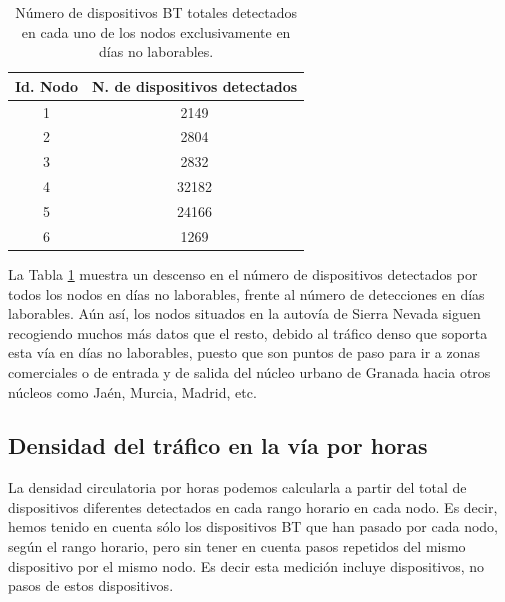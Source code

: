 \documentclass[twocolumn,twoside]{Jornadas}
\begin{document}
 \begin{table}
 \caption{Número de dispositivos BT totales detectados en cada uno de los nodos exclusivamente en días no laborables.
 \label{VehiculosFestivos}}
 \begin{center}
 \begin{tabular}{|c|c|}
 \hline
Id. Nodo  &  N. de dispositivos detectados  \\
 \hline
    1     &    2149  \\
 \hline
    2     &    2804  \\
 \hline
    3     &    2832  \\
 \hline
    4     &    32182  \\
 \hline
    5     &    24166  \\
 \hline
    6     &    1269  \\
 \hline
 \end{tabular}
 \end{center}
 \end{table}

La Tabla \ref{VehiculosFestivos} muestra un descenso en el número de dispositivos detectados por todos los nodos en días no laborables, frente al número de 
detecciones en días laborables. Aún así, los nodos situados en la autovía de Sierra Nevada siguen recogiendo muchos más datos que el resto, debido al 
tráfico denso que soporta esta vía en días no laborables, puesto que son puntos de paso para ir a zonas comerciales o de entrada y de salida del núcleo urbano de Granada hacia otros
núcleos como Jaén, Murcia, Madrid, etc.



\subsection{Densidad del tráfico en la vía por horas}

La densidad circulatoria por horas podemos calcularla a partir del total de dispositivos diferentes detectados en cada rango horario en cada nodo. Es decir, 
hemos tenido en cuenta sólo los dispositivos BT que han pasado por cada nodo, según el rango horario, pero sin tener en cuenta pasos repetidos del mismo dispositivo por el mismo nodo.
Es decir esta medición incluye dispositivos, no pasos de estos dispositivos.


\end{document}
